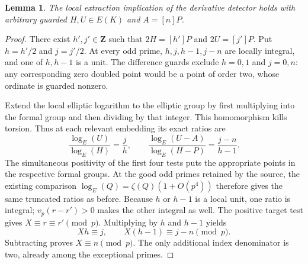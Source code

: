 \documentclass[11pt,a4paper]{article}
\newcommand{\Z}{\mathbf Z}
\newtheorem{lemma}[theorem]{Lemma}
\begin{document}
\begin{lemma}\label{lem:formal}
The local extraction implication of the derivative detector holds
with arbitrary guarded $H,U\in E(K)$ and $A=[n]P$.
\end{lemma}
\begin{proof}
There exist $h',j'\in\Z$ such that
$2H=[h']P$ and $2U=[j']P$. Put $h=h'/2$ and $j=j'/2$.
At every odd prime, $h,j,h-1,j-n$ are locally integral, and one
of $h,h-1$ is a unit. The difference guards exclude $h=0,1$
and $j=0,n$: any corresponding zero doubled point would be a
point of order two, whose ordinate is guarded nonzero.

Extend the local elliptic logarithm to the elliptic group by
first multiplying into the formal group and then dividing by
that integer. This homomorphism kills torsion. Thus at each
relevant embedding its exact ratios are
\[
 \frac{\log_E(U)}{\log_E(H)}=\frac jh,
 \qquad
 \frac{\log_E(U-A)}{\log_E(H-P)}=\frac{j-n}{h-1}.
\]
The simultaneous positivity of the first four tests puts the
appropriate points in the respective formal groups. At the good
odd primes retained by the source, the existing comparison
$\log_E(Q)=\zeta(Q)(1+O(p^4))$ therefore gives the same truncated
ratios as before. Because $h$ or $h-1$ is a local unit, one ratio
is integral; $v_p(r-r')>0$ makes the other integral as well.
The positive target test gives $X\equiv r\equiv r'\pmod p$.
Multiplying by $h$ and $h-1$ yields
\[
 Xh\equiv j,\qquad X(h-1)\equiv j-n\pmod p.
\]
Subtracting proves $X\equiv n\pmod p$. The only additional
index denominator is two, already among the exceptional primes.
\end{proof}
\end{document}
